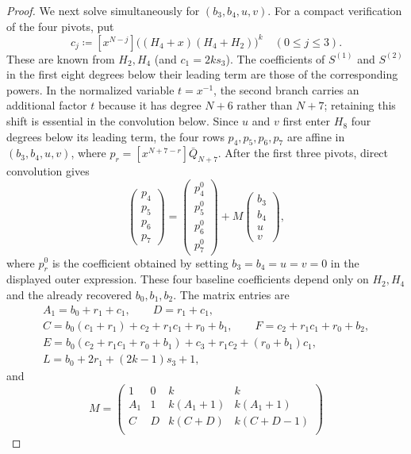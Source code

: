 \begin{proof}
    We next solve simultaneously for $(b_3,b_4,u,v)$.  For a compact
    verification of the four pivots, put
    \[
      c_j\coloneqq [x^{N-j}]
        \bigl((H_4+x)(H_4+H_2)\bigr)^k
        \quad(0\le j\le3).
    \]
    These are known from $H_2,H_4$ (and $c_1=2ks_3$).  The coefficients of
    $S^{(1)}$ and $S^{(2)}$ in the first eight degrees below their leading
    term are those of the corresponding powers.  In the normalized variable
    $t=x^{-1}$, the second branch carries an additional factor $t$ because
    it has degree $N+6$ rather than $N+7$; retaining this shift is essential
    in the convolution below.  Since $u$ and $v$ first
    enter $H_8$ four degrees below its leading term, the four rows
    $p_4,p_5,p_6,p_7$ are affine in $(b_3,b_4,u,v)$, where
    $p_r=[x^{N+7-r}]\bar Q_{N+7}$.  After the first three pivots, direct
    convolution gives
    \[
      \begin{pmatrix}p_4\\p_5\\p_6\\p_7\end{pmatrix}
       =\begin{pmatrix}p^0_4\\p^0_5\\p^0_6\\p^0_7\end{pmatrix}
        +M\begin{pmatrix}b_3\\b_4\\u\\v\end{pmatrix},
    \]
    where $p^0_r$ is the coefficient obtained by setting
    $b_3=b_4=u=v=0$ in the displayed outer expression.  These four baseline
    coefficients depend only on $H_2,H_4$ and the already recovered
    $b_0,b_1,b_2$.  The matrix entries are
    \[
    \begin{gathered}
      A_1=b_0+r_1+c_1,\qquad D=r_1+c_1,\\
      C=b_0(c_1+r_1)+c_2+r_1c_1+r_0+b_1,\qquad
      F=c_2+r_1c_1+r_0+b_2,\\
      E=b_0(c_2+r_1c_1+r_0+b_1)+c_3+r_1c_2
        +(r_0+b_1)c_1,\\
      L=b_0+2r_1+(2k-1)s_3+1,
    \end{gathered}
    \]
    and
    \[
      M=
      \begin{pmatrix}
        1&0&k&k\\
        A_1&1&k(A_1+1)&k(A_1+1)\\
        C&D&k(C+D)&k(C+D-1)\\

\end{pmatrix}\]
\end{proof}
